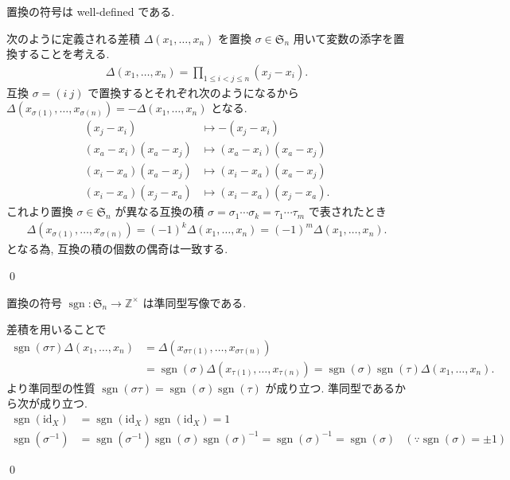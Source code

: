 \documentclass[uplatex,dvipdfmx,a4paper,11pt]{jlreq}
\makeatletter
\DeclareMathOperator{\sgn}{sgn}
\newcommand{\ZZ}{\mathbb{Z}}
\renewcommand{\SS}{\mathfrak{S}}
\newcommand{\id}{\mathrm{id}}
\numberwithin{equation}{section}
\theoremstyle{definition}
\renewenvironment{proof}[1][\proofname]{\par
  \normalfont
  \topsep6\p@\@plus6\p@ \trivlist
  \item[\hskip\labelsep{\bfseries #1}\@addpunct{\bfseries}]\ignorespaces\quad\par
}{
  \qed\endtrivlist\@endpefalse
}
\renewcommand\proofname{証明}
\makeatother
\begin{document}
\begin{proposition}[Q21-7(ii)]
  置換の符号は well-defined である.
\end{proposition}
\begin{proof}
  次のように定義される差積 $\Delta(x_1,\ldots,x_n)$ を置換 $\sigma\in\SS_n$ 用いて変数の添字を置換することを考える.
  \begin{align}
    \Delta(x_1,\ldots,x_n) = \prod_{1\leq i<j\leq n}(x_j - x_i).
  \end{align}
  互換 $\sigma = (i\ j)$ で置換するとそれぞれ次のようになるから $\Delta(x_{\sigma(1)},\ldots,x_{\sigma(n)}) = -\Delta(x_1,\ldots,x_n)$ となる.
  \begin{align}
    (x_j - x_i)            & \mapsto -(x_j - x_i)            \\
    (x_a - x_i)(x_a - x_j) & \mapsto (x_a - x_i)(x_a - x_j)  \\
    (x_i - x_a)(x_a - x_j) & \mapsto (x_i - x_a)(x_a - x_j)  \\
    (x_i - x_a)(x_j - x_a) & \mapsto (x_i - x_a)(x_j - x_a).
  \end{align}
  これより置換 $\sigma\in\SS_n$ が異なる互換の積 $\sigma = \sigma_1\cdots\sigma_k = \tau_1\cdots\tau_m$ で表されたとき
  \begin{align}
    \Delta(x_{\sigma(1)},\ldots,x_{\sigma(n)}) = (-1)^k\Delta(x_1,\ldots,x_n) = (-1)^m\Delta(x_1,\ldots,x_n).
  \end{align}
  となる為, 互換の積の個数の偶奇は一致する.
\end{proof}

\begin{proposition}[Q21-8(i)(ii)(iii)]
  置換の符号 $\sgn: \SS_n\to\ZZ^\times$ は準同型写像である.
\end{proposition}
\begin{proof}
  差積を用いることで
  \begin{align}
    \sgn(\sigma\tau)\Delta(x_1,\ldots,x_n) & = \Delta(x_{\sigma\tau(1)},\ldots,x_{\sigma\tau(n)})                                                 \\
                                           & = \sgn(\sigma)\Delta(x_{\tau(1)},\ldots,x_{\tau(n)}) = \sgn(\sigma)\sgn(\tau)\Delta(x_1,\ldots,x_n).
  \end{align}
  より準同型の性質 $\sgn(\sigma\tau) = \sgn(\sigma)\sgn(\tau)$ が成り立つ. 準同型であるから次が成り立つ.
  \begin{align}
    \sgn(\id_X)       & = \sgn(\id_X)\sgn(\id_X) = 1                                                                                          \\
    \sgn(\sigma^{-1}) & = \sgn(\sigma^{-1})\sgn(\sigma)\sgn(\sigma)^{-1} = \sgn(\sigma)^{-1} = \sgn(\sigma) & (\because \sgn(\sigma) = \pm 1)
  \end{align}
\end{proof}
\end{document}
